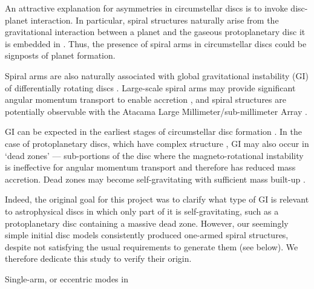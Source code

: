 \documentclass[useAMS,usenatbib]{mn2e}
\begin{document}
An attractive explanation for asymmetries in circumstellar discs is to
invoke disc-planet interaction. In particular, spiral structures
naturally arise from the gravitational interaction between a
planet and the gaseous protoplanetary disc it is embedded in
\citep[see, e.g.][for a recent review]{baruteau13b}. Thus, the
presence of spiral arms in circumstellar discs could be signposts of 
planet formation.  

Spiral arms are also naturally associated with global gravitational 
instability (GI) of differentially rotating discs
\citep{goldreich65,laughlin96b,laughlin98,lodato05,forgan11}. Large-scale
spiral arms may provide significant angular momentum transport to enable
accretion \citep{lynden-bell72, papaloizou91,balbus99,lodato04}, and
spiral structures are potentially observable with the Atacama Large 
Millimeter/sub-millimeter Array \citep{cossins10,dipierror14}.   

GI can be expected in the earliest stages of 
circumstellar disc formation \citep{kratter10b,inutsuka10,tsukamoto13}. %
In the case of protoplanetary discs, which have complex structure
\citep{armitage10}, GI may also occur in `dead
zones' --- sub-portions of the disc where the magneto-rotational
instability is ineffective for angular momentum transport
\citep{gammie96,turner08,landry13} and therefore has reduced mass
accretion. Dead zones may become
self-gravitating with sufficient mass built-up
\citep{armitage01,martin12,martin12b,zhu09,zhu10,zhu10b,bae13,bae14}.   

Indeed, the original goal for this project was to clarify
what type of GI is relevant to astrophysical discs in which only part 
of it is self-gravitating, such as a protoplanetary disc containing a 
massive dead zone. However, our seemingly simple initial disc models
consistently produced one-armed spiral structures, despite not 
satisfying the usual requirements to generate them
(see below). We therefore dedicate this study to verify their origin.     

Single-arm, or eccentric modes in 

















\appendix

\end{document}
